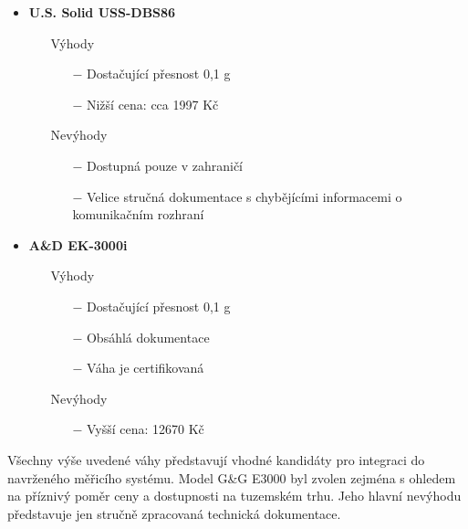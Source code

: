 \begin{itemize}
    \item \textbf{U.S. Solid USS-DBS86}
    \begin{itemize}
        \item[] Výhody
        \begin{itemize}
            \item[$-$] Dostačující přesnost 0,1 g
            \item[$-$] Nižší cena: cca 1997 Kč
        \end{itemize}
        \item[] Nevýhody
        \begin{itemize}
            \item[$-$] Dostupná pouze v zahraničí
            \item[$-$] Velice stručná dokumentace s chybějícími informacemi o komunikačním rozhraní
        \end{itemize}
    \end{itemize}
    
    \item \textbf{A\&D EK-3000i}
    \begin{itemize}
        \item[] Výhody
        \begin{itemize}
            \item[$-$] Dostačující přesnost 0,1 g
            \item[$-$] Obsáhlá dokumentace
            \item[$-$] Váha je certifikovaná
        \end{itemize}
        \item[] Nevýhody
        \begin{itemize}
            \item[$-$] Vyšší cena: 12670 Kč
        \end{itemize}
    \end{itemize} %
\end{itemize}
\smallskip
Všechny výše uvedené váhy představují vhodné kandidáty pro integraci do navrženého měřicího systému. Model G\&G E3000 byl zvolen zejména s ohledem na příznivý poměr ceny a dostupnosti na tuzemském trhu. Jeho hlavní nevýhodu představuje jen stručně zpracovaná technická dokumentace.





